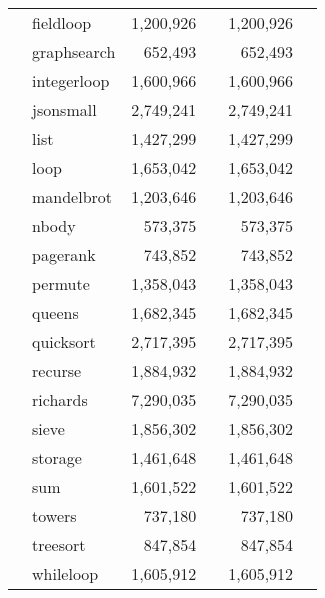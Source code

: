\begin{tabular}{ll@{\hspace{6pt}}r@{\hspace{3pt}}l@{\hspace{6pt}}r@{\hspace{3pt}}l}
 & fieldloop & 1,200,926 &  & 1,200,926 &  \\
 & graphsearch & 652,493 &  & 652,493 &  \\
 & integerloop & 1,600,966 &  & 1,600,966 &  \\
 & jsonsmall & 2,749,241 &  & 2,749,241 &  \\
 & list & 1,427,299 &  & 1,427,299 &  \\
 & loop & 1,653,042 &  & 1,653,042 &  \\
 & mandelbrot & 1,203,646 &  & 1,203,646 &  \\
 & nbody & 573,375 &  & 573,375 &  \\
 & pagerank & 743,852 &  & 743,852 &  \\
 & permute & 1,358,043 &  & 1,358,043 &  \\
 & queens & 1,682,345 &  & 1,682,345 &  \\
 & quicksort & 2,717,395 &  & 2,717,395 &  \\
 & recurse & 1,884,932 &  & 1,884,932 &  \\
 & richards & 7,290,035 &  & 7,290,035 &  \\
 & sieve & 1,856,302 &  & 1,856,302 &  \\
 & storage & 1,461,648 &  & 1,461,648 &  \\
 & sum & 1,601,522 &  & 1,601,522 &  \\
 & towers & 737,180 &  & 737,180 &  \\
 & treesort & 847,854 &  & 847,854 &  \\
 & whileloop & 1,605,912 &  & 1,605,912 &  \\
\bottomrule
\end{tabular}
